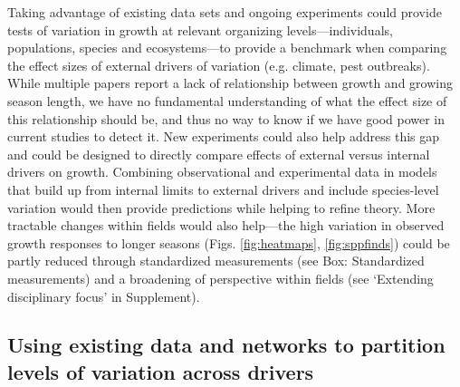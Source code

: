 Taking advantage of existing data sets and ongoing experiments could provide tests of variation in growth at relevant organizing levels---individuals, populations, species and ecosystems---to provide a benchmark when comparing the effect sizes of external drivers of variation (e.g. climate, pest outbreaks). While multiple papers report a lack of relationship between growth and growing season length, we have no fundamental understanding of what the effect size of this relationship should be, and thus no way to know if we have good power in current studies to detect it. New experiments could also help address this gap and could be designed to directly compare effects of external versus internal drivers on growth. Combining observational and experimental data in models that build up from internal limits to external drivers and include species-level variation would then provide predictions while helping to refine theory. More tractable changes within fields would also help---the high variation in observed growth responses to longer seasons (Figs. \ref{fig:heatmaps}, \ref{fig:sppfinds}) could be partly reduced through standardized measurements (see Box: Standardized measurements) and a broadening of perspective within fields (see `Extending disciplinary focus' in Supplement). 


\subsection*{Using existing data and networks to partition levels of variation across drivers}


